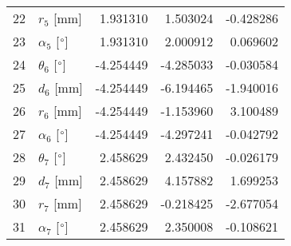 \documentclass{standalone}%
\begin{document}
\begin{tabular}{llrrr}
22 &              $r_{5}$ [mm] &  1.931310 &   1.503024 &  -0.428286 \\
23 &  $\alpha_{5}$ [$\degree$] &  1.931310 &   2.000912 &   0.069602 \\
24 &  $\theta_{6}$ [$\degree$] & -4.254449 &  -4.285033 &  -0.030584 \\
25 &              $d_{6}$ [mm] & -4.254449 &  -6.194465 &  -1.940016 \\
26 &              $r_{6}$ [mm] & -4.254449 &  -1.153960 &   3.100489 \\
27 &  $\alpha_{6}$ [$\degree$] & -4.254449 &  -4.297241 &  -0.042792 \\
28 &  $\theta_{7}$ [$\degree$] &  2.458629 &   2.432450 &  -0.026179 \\
29 &              $d_{7}$ [mm] &  2.458629 &   4.157882 &   1.699253 \\
30 &              $r_{7}$ [mm] &  2.458629 &  -0.218425 &  -2.677054 \\
31 &  $\alpha_{7}$ [$\degree$] &  2.458629 &   2.350008 &  -0.108621 \\
\bottomrule
\end{tabular}
%
\end{document}
